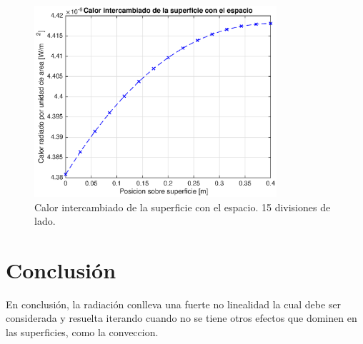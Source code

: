 \documentclass[onecolumn,10pt,titlepage,a4paper]{article}
\begin{document}
\begin{figure}[htb!]
	\centering
	\includegraphics[width=0.8\textwidth]{fig/calorint15.eps}
	\caption{Calor intercambiado de la superficie con el espacio. 15 divisiones de lado.}
	\label{fig:calor}
\end{figure}

\section*{Conclusión}
En conclusión, la radiación conlleva una fuerte no linealidad la cual debe ser considerada y resuelta iterando cuando no se tiene otros efectos que dominen en las superficies, como la conveccion. 



% 
\end{document}
